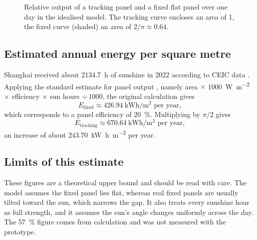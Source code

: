 \documentclass[11pt,a4paper]{article}
\begin{document}
\begin{figure}[H]
  \centering
  \caption{Relative output of a tracking panel and a fixed flat panel over one day in the idealised model. The tracking curve encloses an area of 1, the fixed curve (shaded) an area of $2/\pi\approx0.64$.}
  \label{fig:curves}
\end{figure}

\subsection{Estimated annual energy per square metre}
Shanghai received about \SI{2134.7}{\hour} of sunshine in 2022 according to CEIC data \cite{ceic}. Applying the standard estimate for panel output \cite{yes}, namely area $\times$ \SI{1000}{\watt\per\meter\squared} $\times$ efficiency $\times$ sun hours $\div\,1000$, the original calculation gives
\begin{equation}
  E_{\text{fixed}} \approx \SI{426.94}{\kilo\watt\hour\per\meter\squared}\text{ per year},
\end{equation}
which corresponds to a panel efficiency of \SI{20}{\percent}. Multiplying by $\pi/2$ gives
\begin{equation}
  E_{\text{tracking}} \approx \SI{670.64}{\kilo\watt\hour\per\meter\squared}\text{ per year},
\end{equation}
an increase of about \SI{243.70}{\kilo\watt\hour\per\meter\squared} per year.

\subsection{Limits of this estimate}
These figures are a theoretical upper bound and should be read with care. The model assumes the fixed panel lies flat, whereas real fixed panels are usually tilted toward the sun, which narrows the gap. It also treats every sunshine hour as full strength, and it assumes the sun's angle changes uniformly across the day. The \SI{57}{\percent} figure comes from calculation and was not measured with the prototype.
\end{document}
